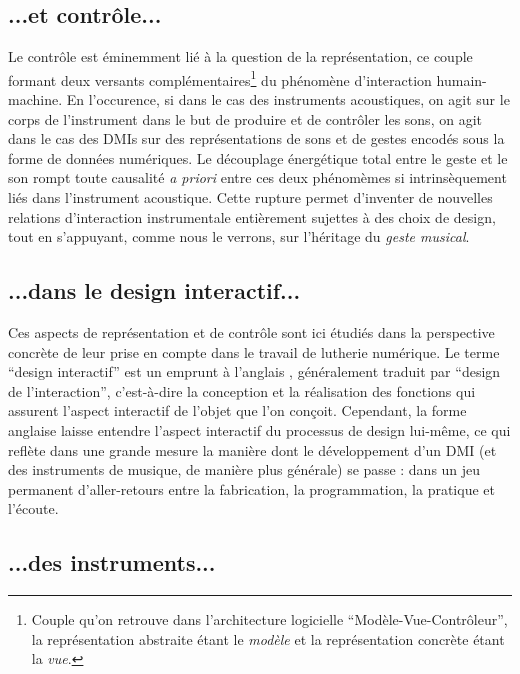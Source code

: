 \subsection*{...et contrôle...}

\noindent Le contrôle est éminemment lié à la question de la représentation, ce couple formant deux versants complémentaires\footnote{Couple qu'on retrouve dans l'architecture logicielle ``Modèle-Vue-Contrôleur'', la représentation abstraite étant le \textit{modèle} et la représentation concrète étant la \textit{vue}.} du phénomène d'interaction humain-machine. En l'occurence, si dans le cas des instruments acoustiques, on agit sur le corps de l'instrument dans le but de produire et de contrôler les sons, on agit dans le cas des \glspl{DMI} sur des représentations de sons et de gestes encodés sous la forme de données numériques. Le découplage énergétique total entre le geste et le son rompt toute causalité \textit{a priori} entre ces deux phénomèmes si intrinsèquement liés dans l'instrument acoustique. Cette rupture permet d'inventer de nouvelles relations d'interaction instrumentale entièrement sujettes à des choix de design, tout en s'appuyant, comme nous le verrons, sur l'héritage du \textit{geste musical}.


\subsection*{...dans le design interactif...}

\noindent Ces aspects de représentation et de contrôle sont ici étudiés dans la perspective concrète de leur prise en compte dans le travail de lutherie numérique. Le terme ``design interactif'' est un emprunt à l'anglais , généralement traduit par ``design de l'interaction'', c'est-à-dire la conception et la réalisation des fonctions qui assurent l'aspect interactif de l'objet que l'on conçoit. Cependant, la forme anglaise laisse entendre l'aspect interactif du processus de design lui-même, ce qui reflète dans une grande mesure la manière dont le développement d'un \gls{DMI} (et des instruments de musique, de manière plus générale) se passe : dans un jeu permanent d'aller-retours entre la fabrication, la programmation, la pratique et l'écoute.

\subsection*{...des instruments...}
 
